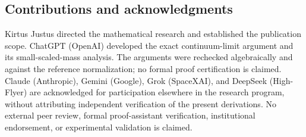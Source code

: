 \documentclass[
  10pt,
  a4paper,
]{article}
\begin{document}
\subsection{Contributions and acknowledgments}\label{contributions-and-acknowledgments}

Kirtus Justus directed the mathematical research and established the publication scope. ChatGPT (OpenAI) developed the exact continuum-limit argument and its small-scaled-mass analysis. The arguments were rechecked algebraically and against the reference normalization; no formal proof certification is claimed. Claude (Anthropic), Gemini (Google), Grok (SpaceXAI), and DeepSeek (High-Flyer) are acknowledged for participation elsewhere in the research program, without attributing independent verification of the present derivations. No external peer review, formal proof-assistant verification, institutional endorsement, or experimental validation is claimed.
\end{document}
